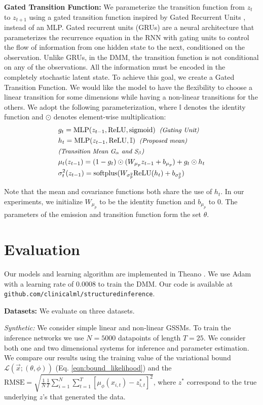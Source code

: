 \documentclass[letterpaper]{article}
\newcommand{\mathtext}[1]{\small{\textit{(#1)}}}
\newcommand{\vecx}{\vec{x}}
\newcommand{\meanfxn}{\textit{G}_{\alpha}}
\newcommand{\covfxn}{\textit{S}_{\beta}}
\newcommand{\lthph}{\mathcal{L}(\vecx;(\theta, \phi))}
\theoremstyle{plain}
\newcommand{\MLP}{\text{MLP}}
\newcommand{\ReLU}{\text{ReLU}}
\newcommand{\Sigmoid}{\text{sigmoid}}
\newcommand{\Softplus}{\text{softplus}}
\newcommand{\citep}{\cite}
\newcommand{\DKF}{DMM\xspace}
\begin{document}
{\bf Gated Transition Function:} 
We parameterize the transition function from $z_t$ to $z_{t+1}$ using
a gated transition function inspired by Gated
Recurrent Units \citep{chung2014empirical}, instead of an MLP.
Gated recurrent units (GRUs) are a neural architecture that parameterizes the recurrence equation in the 
RNN with gating units to control the flow of information from one hidden state to the next, conditioned on the observation. 
Unlike GRUs, in the \DKF, the transition function is not conditional on any of the observations. All the information
must be encoded in the completely stochastic latent state. To achieve this goal, we create 
a Gated Transition Function. 
We would like the model to have the flexibility to choose
a linear transition for some dimensions while having
a non-linear transitions for the others. We 
adopt the following parameterization, where $\mathbb{I}$ denotes 
the identity function and $\odot$ denotes element-wise multiplication:
\begin{align*}
&g_t = \MLP(z_{t-1},\ReLU,\Sigmoid) \;\; \mathtext{Gating Unit}\\
&h_t = \MLP(z_{t-1},\ReLU,\mathbb{I}) \;\; \mathtext{Proposed mean}\nonumber\\
&\mathtext{Transition Mean $\meanfxn$ and $\covfxn$}\nonumber\\
&\mu_t(z_{t-1})  = (1-g_t)\odot(W_{\mu_p}z_{t-1}+b_{\mu_p}) +g_t\odot h_t \nonumber\\
&\sigma^2_t(z_{t-1}) = \Softplus( W_{\sigma_p^2} \ReLU(h_t)+ b_{\sigma_p^2})\nonumber
\end{align*}

Note that the mean and covariance functions both share the use of $h_t$.
In our experiments, we initialize $W_{\mu_p}$ to be the identity function and $b_{\mu_p}$ to $0$.
The parameters of the emission and transition function 
form the set $\theta$. 
 \section{Evaluation}
Our models and learning algorithm are implemented in Theano \cite{theano}. 
We use Adam \cite{kingma2014adam} with a learning rate of $0.0008$ to train the \DKF. 
Our code is available at \texttt{\small github.com/clinicalml/structuredinference}.

\textbf{Datasets: } We evaluate on three datasets. 

\textit{Synthetic: } We consider simple linear and non-linear GSSMs. To train
the inference networks we use $N=5000$ datapoints of length $T=25$. We consider
both one and two dimensional systems for inference and parameter estimation. 
We compare our results using the training value of the variational bound $\lthph$ (Eq. \ref{eqn:bound_likelihood}) and the
$\text{RMSE} = \sqrt{\frac{1}{N} \frac{1}{T}\sum_{i=1}^N \sum_{t=1}^T[\mu_{\phi}(x_{i,t})-z^*_{i,t}]^2}$,
where $z^*$ correspond to the true underlying $z$'s that generated the data. 
\end{document}
